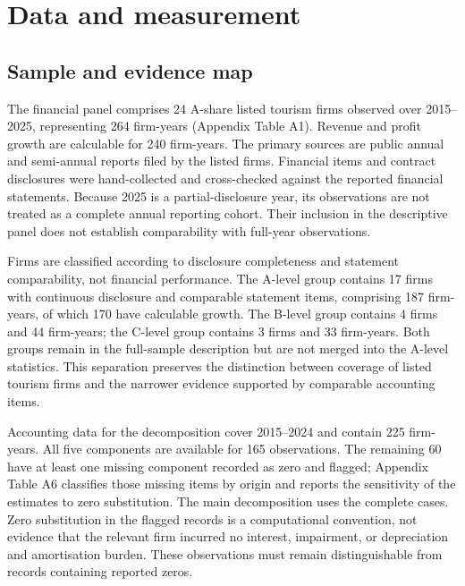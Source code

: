 \documentclass[review,3p,times]{elsarticle}
\begin{document}
\section{Data and measurement}

\subsection{Sample and evidence map}

The financial panel comprises 24 A-share listed tourism firms observed over 2015--2025, representing 264 firm-years (Appendix Table A1). Revenue and profit growth are calculable for 240 firm-years. The primary sources are public annual and semi-annual reports filed by the listed firms. Financial items and contract disclosures were hand-collected and cross-checked against the reported financial statements. Because 2025 is a partial-disclosure year, its observations are not treated as a complete annual reporting cohort. Their inclusion in the descriptive panel does not establish comparability with full-year observations.

Firms are classified according to disclosure completeness and statement comparability, not financial performance. The A-level group contains 17 firms with continuous disclosure and comparable statement items, comprising 187 firm-years, of which 170 have calculable growth. The B-level group contains 4 firms and 44 firm-years; the C-level group contains 3 firms and 33 firm-years. Both groups remain in the full-sample description but are not merged into the A-level statistics. This separation preserves the distinction between coverage of listed tourism firms and the narrower evidence supported by comparable accounting items.

Accounting data for the decomposition cover 2015--2024 and contain 225 firm-years. All five components are available for 165 observations. The remaining 60 have at least one missing component recorded as zero and flagged; Appendix Table A6 classifies those missing items by origin and reports the sensitivity of the estimates to zero substitution. The main decomposition uses the complete cases. Zero substitution in the flagged records is a computational convention, not evidence that the relevant firm incurred no interest, impairment, or depreciation and amortisation burden. These observations must remain distinguishable from records containing reported zeros.
\end{document}
